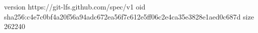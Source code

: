version https://git-lfs.github.com/spec/v1
oid sha256:c4e7c0bf4a20f56a94adc672ea56f7c612e5ff06c2e4ca35e3828e1aed0c687d
size 262240

